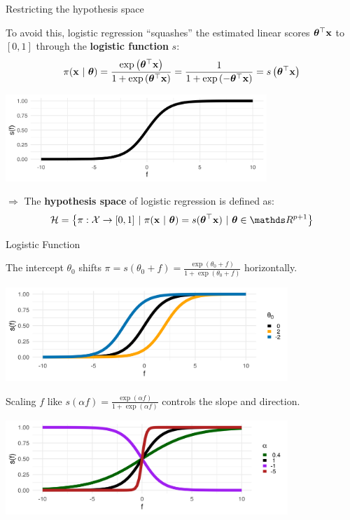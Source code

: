 \documentclass[11pt,compress,t,notes=noshow, xcolor=table]{beamer}
\begin{document}
\begin{vbframe}{Restricting the hypothesis space}

To avoid this, logistic regression \enquote{squashes} the estimated linear scores $\bm{\theta}^\top \mathbf{x}$ to $[0,1]$ through the \textbf{logistic function} $s$:
\[
\pi(\mathbf{x}~|~ \bm{\theta}) = \frac{\exp\left( \bm{\theta}^\top \mathbf{x} \right)}{1+\exp\left(\bm{\theta}^\top \mathbf{x} \right)} = \frac{1}{1+\exp\left( -\bm{\theta}^\top \mathbf{x} \right)} = s\left( \bm{\theta}^\top \mathbf{x} \right)
\]

\begin{center}
  \includegraphics[width=0.74\textwidth]{figure/logistic_function.png} 
\end{center}

$\Rightarrow$ The \textbf{hypothesis space} of logistic regression is defined as:
\begin{eqnarray*}
  \Hspace = \left\{\pi: \Xspace \to [0,1] ~|~\pixt = s(\thx) ~|~ \thetav \in \R^{p+1} \right\}
\end{eqnarray*}

\end{vbframe}

\begin{vbframe}{Logistic Function}

The intercept $\theta_0$ shifts $\pi = s(\theta_0 + f) = \frac{\exp(\theta_0 + f)}{1+\exp(\theta_0 + f)}$ horizontally.

{
\centering \includegraphics[width=0.8\textwidth]{figure/logistic_shifted.png}
}

Scaling $f$ like $s(\alpha f) = \frac{\exp(\alpha f)}{1+\exp(\alpha f)}$ controls the slope and direction.

{
\centering \includegraphics[width=0.8\textwidth]{figure/logistic_scaled.png}
}

\end{vbframe}
\end{document}

